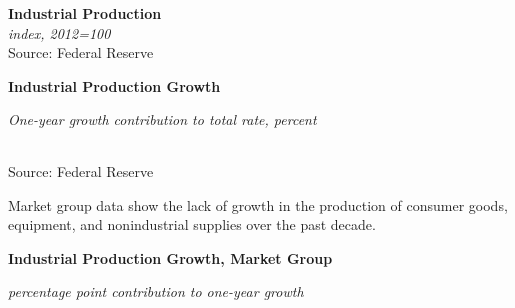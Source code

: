 \documentclass{report}
\makeatletter
\newcommand{\tbllink}[1]{\href{https://raw.githubusercontent.com/bdecon/US-chartbook/master/chartbook/data/#1}{\faTable}}
\newcommand*\short[1]{\expandafter\@gobbletwo\number\numexpr#1\relax}
\newcommand{\sbar}[4]{
		\addplot[ybar stacked, bar width=2.6pt, draw opacity=0, fill=#1] 
			table [x=#2, y=#3, col sep=comma]{#4};}
\newcommand{\dateaxisticks}{
		date coordinates in=x, axis line style={draw=none},
		xmax={2020-08-10},
		max space between ticks=40,	    
		xtick={{1990-01-01}, {1992-01-01}, {1994-01-01}, 
			{1996-01-01}, {1998-01-01}, {2000-01-01}, 
			{2002-01-01}, {2004-01-01}, {2006-01-01},
			{2008-01-01}, {2010-01-01}, {2012-01-01}, {2014-01-01},
		    {2016-01-01}, {2018-01-01}, {2020-01-01}},
		minor xtick={{1989-01-01}, {1991-01-01}, {1993-01-01},
			{1995-01-01}, {1997-01-01}, {1999-01-01}, 
			{2001-01-01}, {2003-01-01}, {2005-01-01}, {2007-01-01},
		    {2009-01-01}, {2011-01-01}, {2013-01-01}, {2015-01-01},
		    {2017-01-01}, {2019-01-01}},
		enlarge y limits={0.06}, enlarge x limits={0.01},
		}
\newcommand{\bbar}[2]{extra #1 ticks = {{#2}}, extra #1 tick labels = ,
		extra #1 tick style = {grid=major, grid style={thick, black!25}},}
\newcommand{\rbars}{
		\fill[color=black!10] (axis cs:{1990-07-01},\pgfkeysvalueof{/pgfplots/ymin}) rectangle 
			(axis cs:{1991-03-01}, \pgfkeysvalueof{/pgfplots/ymax});
		\fill[color=black!10] (axis cs:{2007-12-01},\pgfkeysvalueof{/pgfplots/ymin}) rectangle 
			(axis cs:{2009-07-01}, \pgfkeysvalueof{/pgfplots/ymax});
		\fill[color=black!10] (axis cs:{2001-03-01},\pgfkeysvalueof{/pgfplots/ymin}) rectangle 
			(axis cs:{2001-11-01}, \pgfkeysvalueof{/pgfplots/ymax});
		\fill[color=black!10] (axis cs:{2020-02-01},\pgfkeysvalueof{/pgfplots/ymin}) rectangle 
			(axis cs:{2020-09-01}, \pgfkeysvalueof{/pgfplots/ymax});}
\makeatother
\begin{document}
{{{{\begin{minipage}{0.35\textwidth}
\noindent \normalsize \textbf{Industrial Production}\\
\footnotesize{\textit{index, 2012=100}}\\

\footnotesize{Source: Federal Reserve} \hfill \tbllink{indpro.csv}

\end{minipage}

\vspace{2mm} 

\noindent \normalsize \textbf{Industrial Production Growth}\\
\footnotesize{\textit{One-year growth \hspace{34mm} contribution to total \hspace{12mm} rate, percent}\\ 
\noindent {} \setlength{\tabcolsep}{3.1pt} \color{black!90}
		{\renewcommand{\arraystretch}{1.54}
		 \begin{tabular}{p{2mm} p{44mm} R{7.3mm} R{7.3mm} R{7.3mm} R{7.3mm} | R{8mm} R{7.3mm} 
		   R{7.3mm} R{7.3mm} }
			 \hline
		\end{tabular}}	
		
\footnotesize{Source: Federal Reserve}}

\newpage
\begin{minipage}{0.76\textwidth}
\vspace{3mm}
\small Market group data show the lack of growth in the production of consumer goods, equipment, and nonindustrial supplies over the past decade.

\vspace{3mm}

\normalsize \textbf{Industrial Production Growth, Market Group}

\footnotesize{\textit{percentage point contribution to one-year growth}}

\hspace*{-2mm} 


\end{minipage}}}}}
\end{document}
